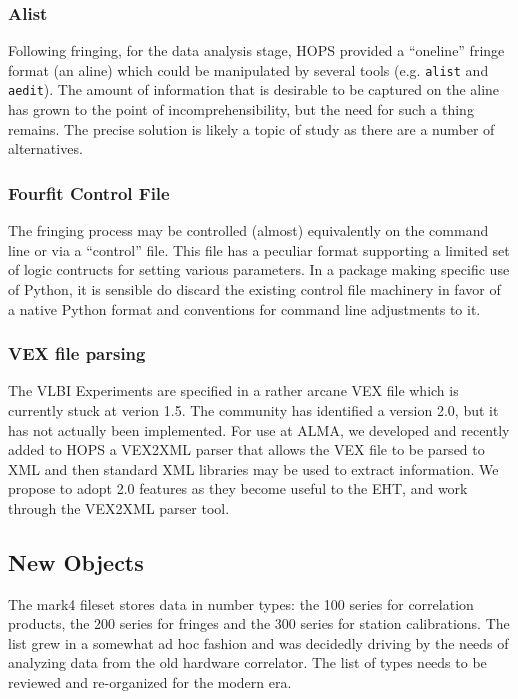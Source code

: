 \subsubsection{Alist}
\label{sec:alist}
Following fringing, for the data analysis stage, HOPS provided a ``oneline''
fringe format (an aline) which could be manipulated by several tools
(e.g. \texttt{alist} and \texttt{aedit}).
The amount of information that is desirable to
be captured on the aline has grown to the point of incomprehensibility,
but the need for such a thing remains.  The precise solution is likely
a topic of study as there are a number of alternatives.

\subsubsection{Fourfit Control File}
\label{sec:control}
The fringing process may be controlled (almost) equivalently on the
command line or via a ``control'' file.  This file has a peculiar
format supporting a limited set of logic contructs for setting various
parameters.  In a package making specific use of Python, it is sensible
do discard the existing control file machinery in favor of a native
Python format and conventions for command line adjustments to it.

\subsubsection{VEX file parsing}
\label{sec:vex2xml}
The VLBI Experiments are specified in a rather arcane VEX file which
is currently stuck at verion 1.5.  The community has identified a version
2.0, but it has not actually been implemented.  For use at ALMA, we
developed and recently added to HOPS a VEX2XML parser that allows the
VEX file to be parsed to XML and then standard XML libraries may be
used to extract information.  We propose to adopt 2.0 features as they
become useful to the EHT, and work through the VEX2XML parser tool.

\subsection{New Objects}
\label{sec:newobjects}
The mark4 fileset stores data in number types:  the 100 series for
correlation products, the 200 series for fringes and the 300 series
for station calibrations.  The list grew in a somewhat ad hoc fashion
and was decidedly driving by the needs of analyzing data from the old
hardware correlator.  The list of types needs to be reviewed and
re-organized for the modern era.

